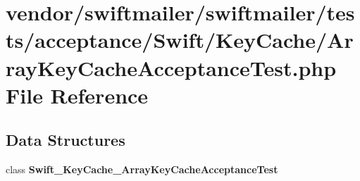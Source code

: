 \section{vendor/swiftmailer/swiftmailer/tests/acceptance/\+Swift/\+Key\+Cache/\+Array\+Key\+Cache\+Acceptance\+Test.php File Reference}
\label{_array_key_cache_acceptance_test_8php}
\subsection*{Data Structures}
\begin{DoxyCompactItemize}
\item 
class {\bf Swift\+\_\+\+Key\+Cache\+\_\+\+Array\+Key\+Cache\+Acceptance\+Test}
\end{DoxyCompactItemize}
